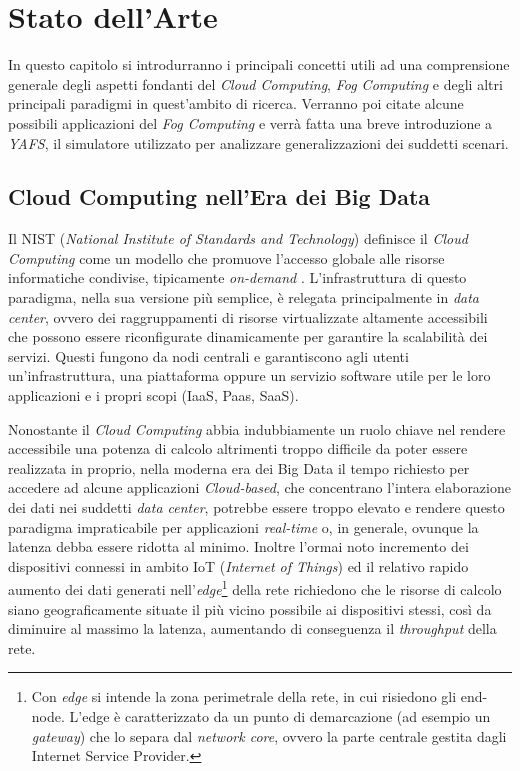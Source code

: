 \chapter{Stato dell'Arte}

In questo capitolo si introdurranno i principali concetti utili ad una comprensione generale degli aspetti fondanti del \textit{Cloud Computing}, \textit{Fog Computing} e degli altri principali paradigmi in quest'ambito di ricerca. Verranno poi citate alcune possibili applicazioni del \textit{Fog Computing} e verrà fatta una breve introduzione a \textit{YAFS}, il simulatore utilizzato per analizzare generalizzazioni dei suddetti scenari.

\section{Cloud Computing nell'Era dei Big Data}

Il NIST (\textit{National Institute of Standards and Technology}) definisce il \textit{Cloud Computing} come un modello che promuove l'accesso globale alle risorse informatiche condivise, tipicamente \textit{on-demand} \cite{NISTCloudComputing}. L'infrastruttura di questo paradigma, nella sua versione più semplice, è relegata principalmente in \textit{data center}, ovvero dei raggruppamenti di risorse virtualizzate altamente accessibili che possono essere riconfigurate dinamicamente per garantire la scalabilità dei servizi. Questi fungono da nodi centrali e garantiscono agli utenti un'infrastruttura, una piattaforma oppure un servizio software utile per le loro applicazioni e i propri scopi (IaaS, Paas, SaaS).

Nonostante il \textit{Cloud Computing} abbia indubbiamente un ruolo chiave nel rendere accessibile una potenza di calcolo altrimenti troppo difficile da poter essere realizzata in proprio, nella moderna era dei Big Data il tempo richiesto per accedere ad alcune applicazioni \textit{Cloud-based}, che concentrano l'intera elaborazione dei dati nei suddetti \textit{data center}, potrebbe essere troppo elevato e rendere questo paradigma impraticabile per applicazioni \textit{real-time} o, in generale, ovunque la latenza debba essere ridotta al minimo. Inoltre l'ormai noto incremento dei dispositivi connessi in ambito IoT (\textit{Internet of Things}) ed il relativo rapido aumento dei dati generati nell'\textit{edge}\footnote{Con \textit{edge} si intende la zona perimetrale della rete, in cui risiedono gli end-node. L'edge è caratterizzato da un punto di demarcazione (ad esempio un \textit{gateway}) che lo separa dal \textit{network core}, ovvero la parte centrale gestita dagli Internet Service Provider.} della rete richiedono che le risorse di calcolo siano geograficamente situate il più vicino possibile ai dispositivi stessi, così da diminuire al massimo la latenza, aumentando di conseguenza il \textit{throughput} della rete.

